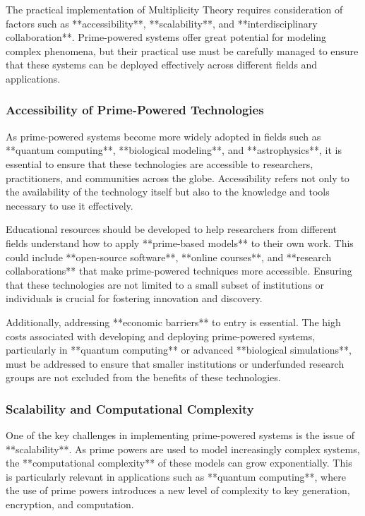\documentclass[12pt]{article}
\begin{document}
The practical implementation of Multiplicity Theory requires consideration of factors such as **accessibility**, **scalability**, and **interdisciplinary collaboration**. Prime-powered systems offer great potential for modeling complex phenomena, but their practical use must be carefully managed to ensure that these systems can be deployed effectively across different fields and applications.

\subsubsection{Accessibility of Prime-Powered Technologies}

As prime-powered systems become more widely adopted in fields such as **quantum computing**, **biological modeling**, and **astrophysics**, it is essential to ensure that these technologies are accessible to researchers, practitioners, and communities across the globe. Accessibility refers not only to the availability of the technology itself but also to the knowledge and tools necessary to use it effectively.

Educational resources should be developed to help researchers from different fields understand how to apply **prime-based models** to their own work. This could include **open-source software**, **online courses**, and **research collaborations** that make prime-powered techniques more accessible. Ensuring that these technologies are not limited to a small subset of institutions or individuals is crucial for fostering innovation and discovery.

Additionally, addressing **economic barriers** to entry is essential. The high costs associated with developing and deploying prime-powered systems, particularly in **quantum computing** or advanced **biological simulations**, must be addressed to ensure that smaller institutions or underfunded research groups are not excluded from the benefits of these technologies.

\subsubsection{Scalability and Computational Complexity}

One of the key challenges in implementing prime-powered systems is the issue of **scalability**. As prime powers are used to model increasingly complex systems, the **computational complexity** of these models can grow exponentially. This is particularly relevant in applications such as **quantum computing**, where the use of prime powers introduces a new level of complexity to key generation, encryption, and computation.
\end{document}
